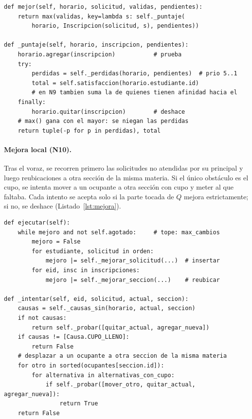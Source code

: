 \begin{lstlisting}[style=python,caption={Puntaje al elegir secci\'on (\texttt{eleccion.py})},label={lst:eleccion}]
def mejor(self, horario, solicitud, validas, pendientes):
    return max(validas, key=lambda s: self._puntaje(
        horario, Inscripcion(solicitud, s), pendientes))

def _puntaje(self, horario, inscripcion, pendientes):
    horario.agregar(inscripcion)           # prueba
    try:
        perdidas = self._perdidas(horario, pendientes)  # prio 5..1
        total = self.satisfaccion(horario.estudiante.id)
        # en N9 tambien suma la de quienes tienen afinidad hacia el
    finally:
        horario.quitar(inscripcion)        # deshace
    # max() gana con el mayor: se niegan las perdidas
    return tuple(-p for p in perdidas), total
\end{lstlisting}

\paragraph{Mejora local (N10).} Tras el voraz, se recorren primero las solicitudes no atendidas por su principal y luego reubicaciones a otra sección de la misma materia. Si el único obstáculo es el cupo, se intenta mover a un ocupante a otra sección con cupo y meter al que faltaba. Cada intento se acepta solo si la parte tocada de $Q$ mejora estrictamente; si no, se deshace (Listado~\ref{lst:mejora}).

\begin{lstlisting}[style=python,caption={Pasadas de mejora y desplazamiento (\texttt{mejora.py})},label={lst:mejora}]
def ejecutar(self):
    while mejoro and not self.agotado:     # tope: max_cambios
        mejoro = False
        for estudiante, solicitud in orden:
            mejoro |= self._mejorar_solicitud(...)  # insertar
        for eid, insc in inscripciones:
            mejoro |= self._mejorar_seccion(...)    # reubicar

def _intentar(self, eid, solicitud, actual, seccion):
    causas = self._causas_sin(horario, actual, seccion)
    if not causas:
        return self._probar([quitar_actual, agregar_nueva])
    if causas != [Causa.CUPO_LLENO]:
        return False
    # desplazar a un ocupante a otra seccion de la misma materia
    for otro in sorted(ocupantes[seccion.id]):
        for alternativa in alternativas_con_cupo:
            if self._probar([mover_otro, quitar_actual, agregar_nueva]):
                return True
    return False
\end{lstlisting}

